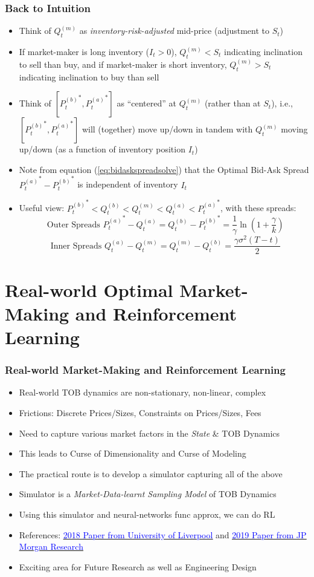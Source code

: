 \documentclass[handout]{beamer}
\begin{document}
\begin{frame}
\frametitle{Back to Intuition}
\pause
\begin{itemize}[<+->]
\item Think of $Q_t^{(m)}$ as {\em inventory-risk-adjusted} mid-price (adjustment to $S_t$)
\item If market-maker is long inventory ($I_t > 0$), $Q_t^{(m)} < S_t$ indicating inclination to sell than buy, and if market-maker is short inventory, $Q_t^{(m)} > S_t$ indicating inclination to buy than sell
\item Think of $[{P_t^{(b)}}^*, {P_t^{(a)}}^*]$ as ``centered'' at $Q_t^{(m)}$ (rather than at $S_t$), i.e., $[{P_t^{(b)}}^*, {P_t^{(a)}}^*]$ will (together) move up/down in tandem with $Q_t^{(m)}$ moving up/down (as a function of inventory position $I_t$)
\item Note from equation (\ref{eq:bidaskspreadsolve}) that the Optimal Bid-Ask Spread ${P_t^{(a)}}^* - {P_t^{(b)}}^*$ is independent of inventory $I_t$
\item Useful view: ${P_t^{(b)}}^* < Q_t^{(b)} < Q_t^{(m)} < Q_t^{(a)} < {P_t^{(a)}}^*$, with these spreads:
$$\mbox{ Outer Spreads } {P_t^{(a)}}^* - Q_t^{(a)} = Q_t^{(b)}  - {P_t^{(b)}}^* = \frac 1 {\gamma} \ln{(1 + \frac {\gamma} k)}$$
$$\mbox{ Inner Spreads } Q_t^{(a)} - Q_t^{(m)} = Q_t^{(m)} - Q_t^{(b)} = \frac {\gamma \sigma^2(T-t)} 2$$
\end{itemize}
\end{frame}


\section{Real-world Optimal Market-Making and Reinforcement Learning}

\begin{frame}
\frametitle{Real-world Market-Making and Reinforcement Learning}
\pause
\begin{itemize}[<+->]
\item Real-world TOB dynamics are non-stationary, non-linear, complex
\item Frictions: Discrete Prices/Sizes, Constraints on Prices/Sizes, Fees
\item Need to capture various market factors in the {\em State} \& TOB Dynamics
\item This leads to Curse of Dimensionality and Curse of Modeling
\item The practical route is to develop a simulator capturing all of the above
\item Simulator is a {\em Market-Data-learnt Sampling Model} of TOB Dynamics 
\item Using this simulator and neural-networks func approx, we can do RL
\item References: \href{https://arxiv.org/pdf/1804.04216.pdf}{\underline{\textcolor{blue}{2018 Paper from University of Liverpool}}} and 
\href{https://arxiv.org/pdf/1911.05892.pdf}{\underline{\textcolor{blue}{2019 Paper from JP Morgan Research}}}
\item Exciting area for Future Research as well as Engineering Design
\end{itemize}
\end{frame}
\end{document}
